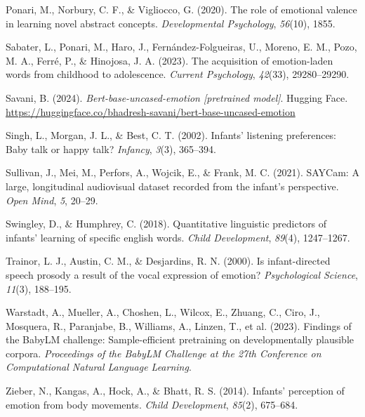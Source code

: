 \documentclass[10pt, letterpaper]{article}
\begin{document}
\begin{CSLReferences}{1}{0}
Ponari, M., Norbury, C. F., \& Vigliocco, G. (2020). The role of
emotional valence in learning novel abstract concepts.
\emph{Developmental Psychology}, \emph{56}(10), 1855.

Sabater, L., Ponari, M., Haro, J., Fernández-Folgueiras, U., Moreno, E.
M., Pozo, M. A., Ferré, P., \& Hinojosa, J. A. (2023). The acquisition
of emotion-laden words from childhood to adolescence. \emph{Current
Psychology}, \emph{42}(33), 29280--29290.

Savani, B. (2024). \emph{Bert-base-uncased-emotion {[}pretrained
model{]}}. Hugging Face.
\url{https://huggingface.co/bhadresh-savani/bert-base-uncased-emotion}

Singh, L., Morgan, J. L., \& Best, C. T. (2002). Infants' listening
preferences: Baby talk or happy talk? \emph{Infancy}, \emph{3}(3),
365--394.

Sullivan, J., Mei, M., Perfors, A., Wojcik, E., \& Frank, M. C. (2021).
SAYCam: A large, longitudinal audiovisual dataset recorded from the
infant's perspective. \emph{Open Mind}, \emph{5}, 20--29.

Swingley, D., \& Humphrey, C. (2018). Quantitative linguistic predictors
of infants' learning of specific english words. \emph{Child
Development}, \emph{89}(4), 1247--1267.

Trainor, L. J., Austin, C. M., \& Desjardins, R. N. (2000). Is
infant-directed speech prosody a result of the vocal expression of
emotion? \emph{Psychological Science}, \emph{11}(3), 188--195.

Warstadt, A., Mueller, A., Choshen, L., Wilcox, E., Zhuang, C., Ciro,
J., Mosquera, R., Paranjabe, B., Williams, A., Linzen, T., et al.
(2023). Findings of the BabyLM challenge: Sample-efficient pretraining
on developmentally plausible corpora. \emph{Proceedings of the BabyLM
Challenge at the 27th Conference on Computational Natural Language
Learning}.

Zieber, N., Kangas, A., Hock, A., \& Bhatt, R. S. (2014). Infants'
perception of emotion from body movements. \emph{Child Development},
\emph{85}(2), 675--684.

\end{CSLReferences}


\end{document}

